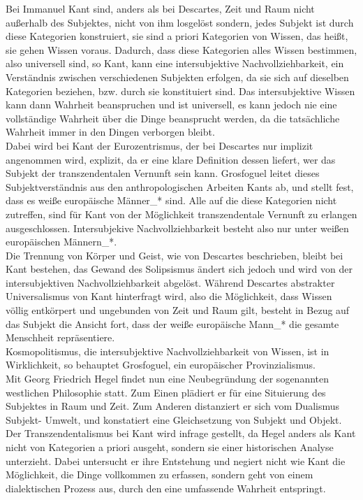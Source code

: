 Bei Immanuel Kant sind, anders als bei Descartes, Zeit und Raum nicht außerhalb
des Subjektes, nicht von ihm losgelöst sondern, jedes Subjekt ist durch diese
Kategorien konstruiert, sie sind a priori Kategorien von Wissen, das heißt, sie
gehen Wissen voraus.  Dadurch, dass diese Kategorien alles Wissen bestimmen,
also universell sind, so Kant, kann eine intersubjektive Nachvollziehbarkeit,
ein Verständnis zwischen verschiedenen Subjekten erfolgen, da sie sich auf
dieselben Kategorien beziehen, bzw. durch sie konstituiert sind.\footnotemark
{} Das intersubjektive Wissen kann dann Wahrheit
beanspruchen und ist universell, es kann jedoch nie eine vollständige Wahrheit
über die Dinge beansprucht werden, da die tatsächliche Wahrheit immer in den
Dingen verborgen bleibt. \\
Dabei wird bei Kant der Eurozentrismus, der bei Descartes nur implizit
angenommen wird, explizit, da er eine klare Definition dessen liefert, wer das
Subjekt der transzendentalen Vernunft sein kann. Grosfoguel leitet dieses
Subjektverständnis aus den anthropologischen Arbeiten Kants ab, und stellt
fest, dass es weiße europäische Männer\_* sind. Alle auf die diese Kategorien
nicht zutreffen, sind für Kant von der Möglichkeit transzendentale Vernunft zu
erlangen ausgeschlossen.\footnotemark {}
 Intersubjekive Nachvollziehbarkeit besteht also nur
unter weißen europäischen Männern\_*.
\\

Die Trennung von Körper und Geist, wie von Descartes beschrieben, bleibt bei
Kant bestehen, das Gewand des Solipsismus ändert sich jedoch und wird von der
intersubjektiven Nachvollziehbarkeit abgelöst. Während Descartes abstrakter
Universalismus von Kant hinterfragt wird, also die Möglichkeit, dass Wissen
völlig entkörpert und ungebunden von Zeit und Raum gilt, besteht in Bezug auf
das Subjekt die Ansicht fort, dass der weiße europäische Mann\_* die gesamte
Menschheit repräsentiere. \\
Kosmopolitismus, die intersubjektive
Nachvollziehbarkeit von Wissen, ist in Wirklichkeit, so behauptet Grosfoguel,
ein europäischer Provinzialismus.
\\

Mit Georg Friedrich Hegel findet nun eine Neubegründung der sogenannten
westlichen Philosophie statt. Zum Einen plädiert er für eine Situierung des
Subjektes in Raum und Zeit.\footnotemark {}
 Zum Anderen distanziert er sich vom Dualismus
Subjekt- Umwelt, und konstatiert eine Gleichsetzung von Subjekt und Objekt. Der
Transzendentalismus bei Kant wird infrage gestellt, da Hegel anders als Kant
nicht von Kategorien a priori ausgeht, sondern sie einer historischen Analyse
unterzieht. Dabei untersucht er ihre Entstehung und negiert nicht wie Kant die
Möglichkeit, die Dinge vollkommen zu erfassen, sondern geht von einem
dialektischen Prozess aus, durch den eine umfassende Wahrheit entspringt.\footnotemark {}
 
